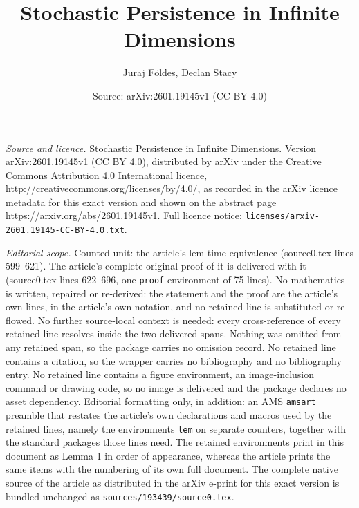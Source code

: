\documentclass[10pt,a4paper]{amsart}
\title{Stochastic Persistence in Infinite Dimensions}
\author{Juraj F{ö}ldes, Declan Stacy}
\date{Source: arXiv:2601.19145v1 (CC BY 4.0)}
\begin{document}
\maketitle

\noindent\emph{Source and licence.} Stochastic Persistence in Infinite Dimensions. Version arXiv:2601.19145v1 (CC BY 4.0), distributed by arXiv under the Creative Commons Attribution 4.0 International licence, http://creativecommons.org/licenses/by/4.0/, as recorded in the arXiv licence metadata for this exact version and shown on the abstract page https://arxiv.org/abs/2601.19145v1. Full licence notice: \texttt{licenses/arxiv-2601.19145-CC-BY-4.0.txt}.\par\smallskip

\noindent\textit{Editorial scope.} Counted unit: the article's lem time-equivalence (source0.tex lines 599--621). The article's complete original proof of it is delivered with it (source0.tex lines 622--696, one \texttt{proof} environment of 75 lines). No mathematics is written, repaired or re-derived: the statement and the proof are the article's own lines, in the article's own notation, and no retained line is substituted or re-flowed.  No further source-local context is needed: every cross-reference of every retained line resolves inside the two delivered spans.  Nothing was omitted from any retained span, so the package carries no omission record.  No retained line contains a citation, so the wrapper carries no bibliography and no bibliography entry.  No retained line contains a figure environment, an image-inclusion command or drawing code, so no image is delivered and the package declares no asset dependency.  Editorial formatting only, in addition: an AMS \texttt{amsart} preamble that restates the article's own declarations and macros used by the retained lines, namely the environments \texttt{lem} on separate counters, together with the standard packages those lines need.  The retained environments print in this document as Lemma 1 in order of appearance, whereas the article prints the same items with the numbering of its own full document.  The complete native source of the article as distributed in the arXiv e-print for this exact version is bundled unchanged as \texttt{sources/193439/source0.tex}.
\end{document}

